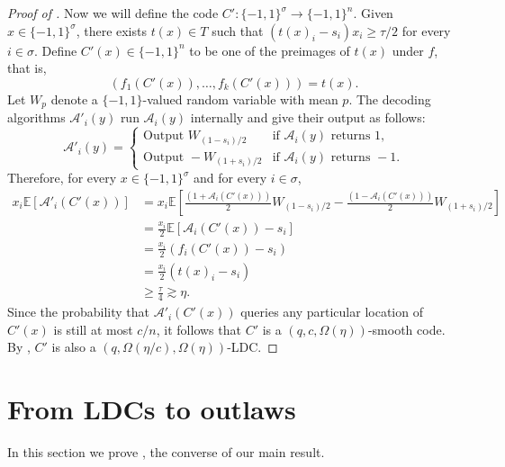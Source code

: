 \documentclass{toc}
\newcommand{\pmset}[1]{\{-1,1\}^{#1}} %
\newcommand{\sBC}{{\{-1,1\}}}
\newcommand{\E}{\mathbb{E}}
\newcommand{\cA}{{\mathcal A}}
\begin{document}
\begin{proof}[Proof of ]
Now we will define the code $C':\sBC^\sigma \to \sBC^n$. Given $x\in \sBC^\sigma$, there exists $t(x)\in T$ such that $(t(x)_i-s_i)x_i\ge \tau/2$ for every $i\in \sigma$. Define $C'(x)\in \pmset{n}$ to be one of the preimages of $t(x)$ under $f$, that is,
 $$\left(f_1(C'(x)),\dots,f_k(C'(x))\right)=t(x).$$ Let $W_p$ denote a $\sBC$-valued random variable with mean $p$. The decoding algorithms $\cA'_i(y)$ run $\cA_i(y)$ internally and give their output as follows: 
\[
\cA'_i(y)=
\begin{cases}
\text{Output } W_{(1-s_i)/2} & \text{if }\cA_i(y) \text{ returns } 1,\\
\text{Output } -W_{(1+s_i)/2} & \text{if }\cA_i(y) \text{ returns } -1.
\end{cases}
\]
 Therefore, for every $x\in \pmset{\sigma}$ and for every $i\in \sigma$,
\begin{align*}
x_i\E[\cA'_i(C'(x))] &=x_i\E\left[\frac{(1+\cA_i(C'(x)))}{2}W_{(1-s_i)/2}-\frac{(1-\cA_i(C'(x)))}{2}W_{(1+s_i)/2}\right]\\
&=\frac{x_i}{2}\E\left[\cA_i(C'(x))-s_i\right]\\
&=\frac{x_i}{2}(f_i(C'(x))-s_i)\\
&=\frac{x_i}{2}(t(x)_i-s_i)\\
&\ge \frac{\tau}{4}\gtrsim \eta.
\end{align*}
Since the probability that $\cA'_i(C'(x))$ queries any particular location of $C'(x)$ is still at most $c/n$, it follows that $C'$ is a $(q,c,\Omega(\eta))$-smooth code. By , $C'$ is also a $(q,\Omega(\eta/c),\Omega(\eta))$-LDC. 
  \end{proof}


%
\section{From LDCs to outlaws}
\label{sec:ldc2outlaw}

In this section we prove , the converse of our main result.
\end{document}
